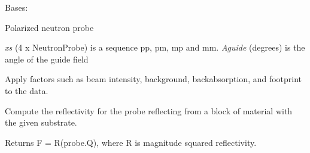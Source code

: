 \documentclass[letterpaper,10pt,english]{sphinxmanual}
\begin{document}

\begin{fulllineitems}
\label{api/probe:refl1d.probe.PolarizedNeutronProbe}
Bases: 

Polarized neutron probe

\emph{xs} (4 x NeutronProbe) is a sequence pp, pm, mp and mm.
\emph{Aguide} (degrees) is the angle of the guide field

\begin{fulllineitems}
\label{api/probe:refl1d.probe.PolarizedNeutronProbe.apply_beam}
Apply factors such as beam intensity, background, backabsorption,
and footprint to the data.

\end{fulllineitems}


\begin{fulllineitems}
\label{api/probe:refl1d.probe.PolarizedNeutronProbe.calc_Q}
\end{fulllineitems}


\begin{fulllineitems}
\label{api/probe:refl1d.probe.PolarizedNeutronProbe.fresnel}
Compute the reflectivity for the probe reflecting from a block of
material with the given substrate.

Returns F = R(probe.Q), where R is magnitude squared reflectivity.

\end{fulllineitems}


\begin{fulllineitems}
\label{api/probe:refl1d.probe.PolarizedNeutronProbe.mm}
\end{fulllineitems}



\end{fulllineitems}
\end{document}
